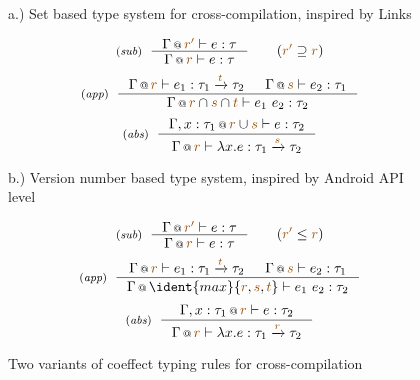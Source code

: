 
\begin{figure}[t]

{\small a.) Set based type system for cross-compilation, inspired by Links \cite{app-distributed-links}}

\begin{equation*}
\tyrule{sub}
  {\coctx{\Gamma}{\aclrd{r'}} \vdash e : \tau }
  {\coctx{\Gamma}{\aclrd{r}} \vdash e : \tau }\quad\quad(\aclrd{r'} \supseteq \aclrd{r})
\end{equation*}
\begin{equation*}
\tyrule{app}
  {\coctx{\Gamma}{\aclrd{r}} \vdash e_1 : \tau_1 \xrightarrow{\aclrd{t}} \tau_2 &
   \coctx{\Gamma}{\aclrd{s}} \vdash e_2 : \tau_1 }
  {\coctx{\Gamma}{\aclrd{r} \cap \aclrd{s} \cap \aclrd{t}} \vdash e_1~e_2 : \tau_2}
\end{equation*}
\begin{equation*}
\tyrule{abs}
  {\coctx{\Gamma, x:\tau_1}{\aclrd{r} \cup \aclrd{s}} \vdash e : \tau_2}
  {\coctx{\Gamma}{\aclrd{r}} \vdash \lambda x.e : \tau_1 \xrightarrow{\aclrd{s}} \tau_2 }
\end{equation*}
\vspace{0.5em}

{\small b.) Version number based type system, inspired by Android API level \cite{app-android-multitarget}}

\begin{equation*}
\tyrule{sub}
  {\coctx{\Gamma}{\aclrd{r'}} \vdash e : \tau }
  {\coctx{\Gamma}{\aclrd{r}} \vdash e : \tau }\quad\quad(\aclrd{r'} \leq \aclrd{r})
\end{equation*}
\begin{equation*}
\tyrule{app}
  {\coctx{\Gamma}{\aclrd{r}} \vdash e_1 : \tau_1 \xrightarrow{\aclrd{t}} \tau_2 &
   \coctx{\Gamma}{\aclrd{s}} \vdash e_2 : \tau_1 }
  {\coctx{\Gamma}{\ident{max} \{\aclrd{r}, \aclrd{s}, \aclrd{t} \}} \vdash e_1~e_2 : \tau_2}
\end{equation*}
\begin{equation*}
\tyrule{abs}
  {\coctx{\Gamma, x:\tau_1}{\aclrd{r}} \vdash e : \tau_2}
  {\coctx{\Gamma}{\aclrd{r}} \vdash \lambda x.e : \tau_1 \xrightarrow{\aclrd{r}} \tau_2 }
\end{equation*}

\caption{Two variants of coeffect typing rules for cross-compilation}
\label{fig:applications-flat-cross}
\vspace{-1em}
\end{figure}

